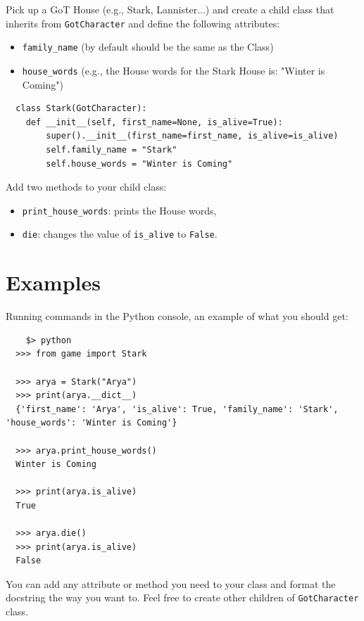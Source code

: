 \documentclass{42-en}
\begin{document}
Pick up a GoT House (e.g., Stark, Lannister...) and create a child class that inherits from \texttt{GotCharacter} and 
define the following attributes:
\begin{itemize}
  \item \texttt{family\_name} (by default should be the same as the Class)
  \item \texttt{house\_words} (e.g., the House words for the Stark House is: "Winter is Coming")
\end{itemize}

\begin{verbatim}
  class Stark(GotCharacter):
    def __init__(self, first_name=None, is_alive=True):
        super().__init__(first_name=first_name, is_alive=is_alive)
        self.family_name = "Stark"
        self.house_words = "Winter is Coming"
\end{verbatim}

Add two methods to your child class:
\begin{itemize}
  \item \texttt{print\_house\_words}: prints the House words,
  \item \texttt{die}: changes the value of \texttt{is\_alive} to \texttt{False}.
\end{itemize}

\section*{Examples}

Running commands in the Python console, an example of what you should get:

\begin{verbatim}
	$> python
  >>> from game import Stark
  
  >>> arya = Stark("Arya")
  >>> print(arya.__dict__)
  {'first_name': 'Arya', 'is_alive': True, 'family_name': 'Stark', 'house_words': 'Winter is Coming'}
  
  >>> arya.print_house_words()
  Winter is Coming
  
  >>> print(arya.is_alive)
  True
  
  >>> arya.die()
  >>> print(arya.is_alive)
  False
\end{verbatim}

You can add any attribute or method you need to your class and format the docstring the way you want to.
Feel free to create other children of \texttt{GotCharacter} class.
\end{document}
